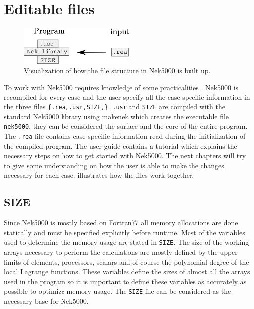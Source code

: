 \section{Editable files}
%
\begin{figure}[h]
	\centering
	\includegraphics[width=0.5\textwidth]{Figures/filestructure2.png}
	\caption{Visualization of how the file structure in Nek5000 is built up.}
	\label{fig:files}
\end{figure}
%
To work with Nek5000 requires knowledge of some practicalities .
Nek5000 is recompiled for every case and the user specify all the case specific 
information in the three files \verb|{.rea,.usr,SIZE,}|. \verb|.usr| and \verb|SIZE| are 
compiled with the standard Nek5000 library using makenek which creates the executable file \verb|nek5000|,
they can be considered the surface and the core of the entire program. 
The \verb|.rea| file contains case-specific information read during the initialization of the 
compiled program. The user guide \cite{Nek} contains a tutorial which explains the necessary 
steps on how to get started with Nek5000. The next chapters will try to give some understanding on 
how the user is able to make the changes necessary for each case.  illustrates 
how the files work together. 
%
\subsection{SIZE}
Since Nek5000 is mostly based on Fortran77 all memory allocations are done statically and must be specified explicitly 
before runtime. Most of the variables used to determine the memory usage are stated in \verb|SIZE|.
The size of the working arrays necessary to perform the calculations are mostly defined by the upper limits of elements, 
processors, scalars and of course the polynomial degree
of the local Lagrange functions. These variables define the sizes of almost all 
the arrays used in the program so it is important to define these variables as accurately 
as possible to optimize memory usage. The \verb|SIZE| file can be considered as the necessary base 
for Nek5000.
